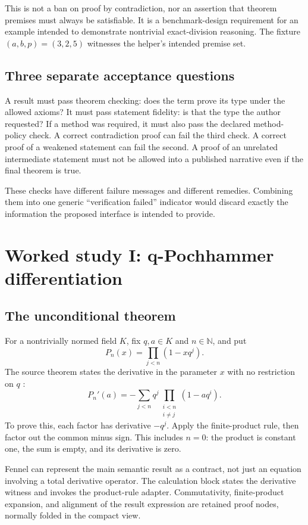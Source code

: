 \documentclass[11pt,a4paper]{article}
\theoremstyle{definition}
\theoremstyle{remark}
\newcommand{\code}[1]{\texttt{\detokenize{#1}}}
\newcommand{\NN}{\mathbb N}
\begin{document}
This is not a ban on proof by contradiction, nor an assertion that theorem
premises must always be satisfiable. It is a benchmark-design requirement for
an example intended to demonstrate nontrivial exact-division reasoning. The
fixture $(a,b,p)=(3,2,5)$ witnesses the helper's intended premise set.

\subsection{Three separate acceptance questions}
A result must pass theorem checking: does the term prove its type under the
allowed axioms? It must pass statement fidelity: is that the type the author
requested? If a method was required, it must also pass the declared
method-policy check. A correct contradiction proof can fail the third check.
A correct proof of a weakened statement can fail the second. A proof of an
unrelated intermediate statement must not be allowed into a published narrative
even if the final theorem is true.

These checks have different failure messages and different remedies. Combining
them into one generic ``verification failed'' indicator would discard exactly
the information the proposed interface is intended to provide.

\section{Worked study I: q-Pochhammer differentiation}
\label{sec:qpoch}

\subsection{The unconditional theorem}
For a nontrivially normed field $K$, fix $q,a\in K$ and $n\in\NN$, and put
\[
 P_n(x)=\prod_{j<n}(1-xq^j).
\]
The source theorem states the derivative in the parameter $x$ with no
restriction on $q$ \cite{qpoch}:
\begin{equation}\label{eq:product-deriv}
 P_n'(a)=-\sum_{j<n}q^j\prod_{\substack{i<n\\i\ne j}}(1-aq^i).
\end{equation}
To prove this, each factor has derivative $-q^j$. Apply the finite-product
rule, then factor out the common minus sign. This includes $n=0$: the product
is constant one, the sum is empty, and its derivative is zero.

Fennel can represent the main semantic result as a \code{HasDerivAt} contract,
not just an equation involving a total derivative operator. The calculation
block states the derivative witness and invokes the product-rule adapter.
Commutativity, finite-product expansion, and alignment of the result expression
are retained proof nodes, normally folded in the compact view.
\end{document}
